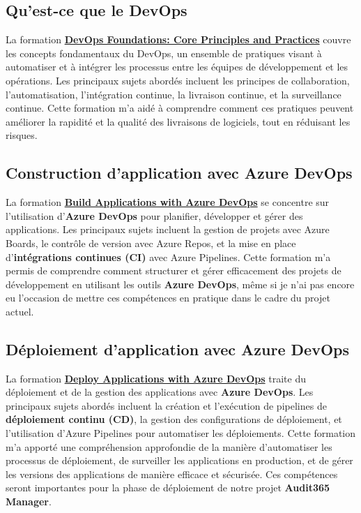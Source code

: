\subsection{Qu'est-ce que le DevOps}

La formation \textbf{\href{https://learn.microsoft.com/en-us/training/paths/devops-foundations-core-principles-practices/}{DevOps Foundations: Core Principles and Practices}} couvre les concepts fondamentaux du DevOps, un ensemble de pratiques visant à automatiser et à intégrer les processus entre les équipes de développement et les opérations. Les principaux sujets abordés incluent les principes de collaboration, l'automatisation, l'intégration continue, la livraison continue, et la surveillance continue. Cette formation m'a aidé à comprendre comment ces pratiques peuvent améliorer la rapidité et la qualité des livraisons de logiciels, tout en réduisant les risques.

\subsection{Construction d’application avec Azure DevOps}

La formation \textbf{\href{https://learn.microsoft.com/en-us/training/paths/build-applications-with-azure-devops/}{Build Applications with Azure DevOps}} se concentre sur l'utilisation d'\textbf{Azure DevOps} pour planifier, développer et gérer des applications. Les principaux sujets incluent la gestion de projets avec Azure Boards, le contrôle de version avec Azure Repos, et la mise en place d'\textbf{intégrations continues (CI)} avec Azure Pipelines. Cette formation m'a permis de comprendre comment structurer et gérer efficacement des projets de développement en utilisant les outils \textbf{Azure DevOps}, même si je n'ai pas encore eu l'occasion de mettre ces compétences en pratique dans le cadre du projet actuel.

\subsection{Déploiement d’application avec Azure DevOps}

La formation \textbf{\href{https://learn.microsoft.com/en-us/training/paths/deploy-applications-with-azure-devops/}{Deploy Applications with Azure DevOps}} traite du déploiement et de la gestion des applications avec \textbf{Azure DevOps}. Les principaux sujets abordés incluent la création et l'exécution de pipelines de \textbf{déploiement continu (CD)}, la gestion des configurations de déploiement, et l'utilisation d'Azure Pipelines pour automatiser les déploiements. Cette formation m'a apporté une compréhension approfondie de la manière d'automatiser les processus de déploiement, de surveiller les applications en production, et de gérer les versions des applications de manière efficace et sécurisée. Ces compétences seront importantes pour la phase de déploiement de notre projet \textbf{Audit365 Manager}.

